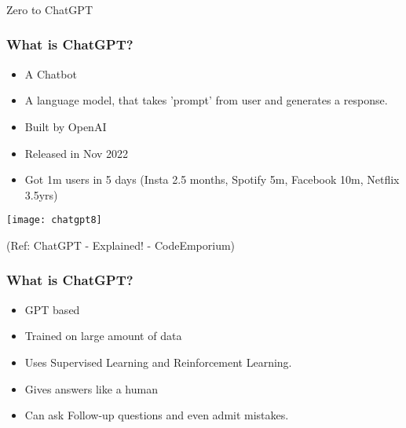 \begin{frame}[fragile]\frametitle{}
\begin{center}
{\Large Zero to ChatGPT}
\end{center}
\end{frame}




\begin{frame}[fragile]\frametitle{What is ChatGPT?}


\begin{itemize}
\item A Chatbot
\item A language model, that takes 'prompt' from user and generates a response.
\item Built by OpenAI
\item Released in Nov 2022
\item Got 1m users in 5 days  (Insta 2.5 months, Spotify 5m, Facebook 10m, Netflix 3.5yrs)
\end{itemize}	 

\begin{center}
\texttt{[image: chatgpt8]}
\end{center}				
{\tiny (Ref: ChatGPT - Explained! - CodeEmporium)}
			
			
\end{frame}

\begin{frame}[fragile]\frametitle{What is ChatGPT?}


\begin{itemize}
\item GPT based
\item Trained on large amount of data
\item Uses Supervised Learning and Reinforcement Learning.
\item Gives answers like a human
\item Can ask Follow-up questions and even admit mistakes.
\end{itemize}	 

\end{frame}


